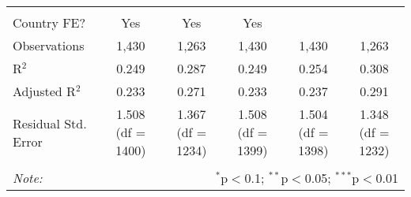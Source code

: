 \begin{table}[!htbp]
\begin{tabular}{@{\extracolsep{5pt}}lccccc}
  & & & & & \\ 
\hline \\[-1.8ex] 
Country FE? & Yes & Yes & Yes &  &  \\ 
Observations & 1,430 & 1,263 & 1,430 & 1,430 & 1,263 \\ 
R$^{2}$ & 0.249 & 0.287 & 0.249 & 0.254 & 0.308 \\ 
Adjusted R$^{2}$ & 0.233 & 0.271 & 0.233 & 0.237 & 0.291 \\ 
Residual Std. Error & 1.508 (df = 1400) & 1.367 (df = 1234) & 1.508 (df = 1399) & 1.504 (df = 1398) & 1.348 (df = 1232) \\ 
\hline 
\hline \\[-1.8ex] 
\textit{Note:}  & \multicolumn{5}{r}{$^{*}$p$<$0.1; $^{**}$p$<$0.05; $^{***}$p$<$0.01} \\ 
\end{tabular} 
\end{table} 
